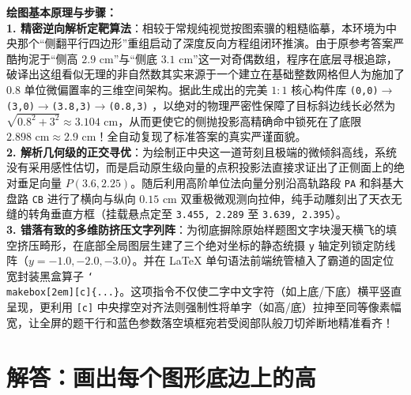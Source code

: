 {\small\color{blue!70!black}
\textbf{绘图基本原理与步骤：}\\
\textbf{1. 精密逆向解析定靶算法}：相较于常规纯视觉按图索骥的粗糙临摹，本环境为中央那个“侧翻平行四边形”重组启动了深度反向方程组闭环推演。由于原参考答案严酷拘泥于“侧高 $2.9\text{ cm}$”与“侧底 $3.1\text{ cm}$”这一对奇偶数组，程序在底层寻根追踪，破译出这组看似无理的非自然数其实来源于一个建立在基础整数网格但人为施加了 $0.8$ 单位微偏置率的三维空间架构。据此生成出的完美 $1:1$ 核心构件库 \texttt{(0,0)$\to$(3,0)$\to$(3.8,3)$\to$(0.8,3)} ，以绝对的物理严密性保障了目标斜边线长必然为 $\sqrt{0.8^2 + 3^2} \approx 3.104 \text{ cm}$，从而更使它的侧抛投影高精确命中锁死在了底限 $2.898 \text{ cm} \approx 2.9 \text{ cm}$！全自动复现了标准答案的真实严谨面貌。\\
\textbf{2. 解析几何级的正交寻优}：为绘制正中央这一道苛刻且极端的微倾斜高线，系统没有采用感性估切，而是启动原生级向量的点积投影法直接求证出了正侧面上的绝对垂足向量 $P(3.6, 2.25)$。随后利用高阶单位法向量分别沿高轨路段 \texttt{PA} 和斜基大盘路 \texttt{CB} 进行了横向与纵向 $0.15\text{ cm}$ 双重极微观测向拉伸，纯手动雕刻出了天衣无缝的转角垂直方框（挂载悬点定至 \texttt{3.455, 2.289} 至 \texttt{3.639, 2.395}）。\\
\textbf{3. 错落有致的多维防挤压文字列阵}：为彻底摒除原始样题图文字块漫天横飞的填空挤压畸形，在底部全局图层生建了三个绝对坐标的静态统摄 \texttt{y} 轴定列锁定防线阵（$y={-}1.0, {-}2.0, {-}3.0$）。并在 LaTeX 单句语法前端统管植入了霸道的固定位宽封装黑盒算子 \texttt{\char`\\makebox[2em][c]\{...\}}。这项指令不仅使二字中文字符（如上底/下底）横平竖直呈现，更利用 \texttt{[c]} 中央撑空对齐法则强制性将单字（如高/底）拉抻至同等像素幅宽，让全屏的题干行和蓝色参数落空填框宛若受阅部队般刀切斧断地精准看齐！
}


\newpage



\newpage

\section{解答：画出每个图形底边上的高}

\vspace{0.6cm}

